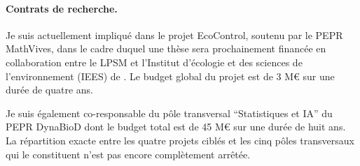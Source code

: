 
\paragraph{Contrats de recherche.}

Je suis actuellement impliqué dans le projet EcoControl, soutenu par le PEPR MathVives, dans le cadre duquel une thèse sera prochainement financée en collaboration entre le LPSM et l’Institut d'écologie et des sciences de l'environnement (IEES) de \SU. Le budget global du projet est de 3 M\euro\xspace sur une durée de quatre ans.

Je suis également co-responsable du pôle transversal “Statistiques et IA” du PEPR DynaBioD dont le budget total est de 45 M\euro\xspace sur une durée de huit ans. La répartition exacte entre les quatre projets ciblés et les cinq pôles transversaux qui le constituent n'est pas encore complètement arrêtée.


